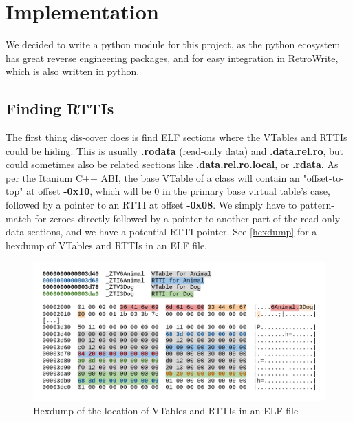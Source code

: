 \documentclass[a4paper,11pt,oneside]{report}
\begin{document}
\chapter{Implementation}



We decided to write a python module for this project, as the python ecosystem 
has great reverse engineering packages, and for easy integration in RetroWrite, 
which is also written in python.

\section{Finding RTTIs}

The first thing dis-cover does is find ELF sections where the VTables and RTTIs 
could be hiding.
This is usually \textbf{.rodata} (read-only data) and \textbf{.data.rel.ro}, 
but could sometimes also be related sections like \textbf{.data.rel.ro.local}, 
or \textbf{.rdata}.
As per the Itanium C++ ABI, the base VTable of a class will contain an 
"offset-to-top" at offset \textbf{-0x10}, which will be 0 in the primary base 
virtual table's case, followed by a pointer to an RTTI at offset
\textbf{-0x08}.
We simply have to pattern-match for zeroes directly followed by a pointer to 
another part of the read-only data sections, and we have a potential RTTI 
pointer. See \autoref{hexdump} for a hexdump of VTables and RTTIs in an ELF
file.

\begin{figure}[h]

\includegraphics[width=16cm]{hexdump.png}
\caption{Hexdump of the location of VTables and RTTIs in an ELF file}
\label{hexdump}

\end{figure}
\end{document}
